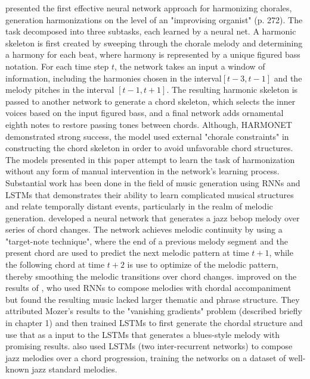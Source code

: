 \documentclass[11pt]{article}
\begin{document}
\citet{hild1992harmonet} presented the first effective neural network approach for harmonizing chorales, generation harmonizations on the level of an "improvising organist" (p. 272). The task decomposed into three subtasks, each learned by a neural net. A harmonic skeleton is first created by sweeping through the chorale melody and determining a harmony for each beat, where harmony is represented by a unique figured bass notation. For each time step $t$, the network takes an input a window of information, including the harmonies chosen in the interval$[t-3, t-1]$ and the melody pitches in the interval $[t-1, t+1]$. The resulting harmonic skeleton is passed to another network to generate a chord skeleton, which selects the inner voices based on the input figured bass, and a final network adds ornamental eighth notes to restore passing tones between chords. Although, HARMONET demonstrated strong success, the model used external "chorale constraints" \citep[p.~271]{hild1992harmonet} in constructing the chord skeleton in order to avoid unfavorable chord structures. The models presented in this paper attempt to learn the task of harmonization without any form of manual intervention in the network's learning process. \\

Substantial work has been done in the field of music generation using RNNs and LSTMs that demonstrates their ability to learn complicated musical structures and relate temporally distant events, particularly in the realm of melodic generation. \citet{petri1995bebop} developed a neural network that generates a jazz bebop melody over series of chord changes. The network achieves melodic continuity by using a "target-note technique", where the end of a previous melody segment and the present chord are used to predict the next melodic pattern at time $t+1$, while the following chord at time $t+2$ is use to optimize of the melodic pattern, thereby smoothing the melodic transitions over chord changes. \citet{eck2002structure} improved on the results of \citet{mozer1994neural}, who used RNNs to compose melodies with chordal accompaniment but found the resulting music lacked larger thematic and phrase structure. They attributed Mozer's results to the "vanishing gradients" problem (described briefly in chapter 1) and then trained LSTMs to first generate the chordal structure and use that as a input to the LSTMs that generates a blues-style melody with promising results. \citet{franklin2006jazz} also used LSTMs (two inter-recurrent networks) to compose jazz melodies over a chord progression, training the networks on a dataset of well-known jazz standard melodies. \\
\end{document}
